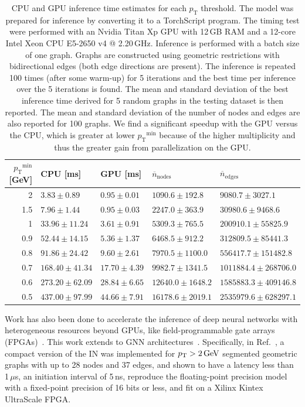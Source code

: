 \documentclass[twocolumn]{svjour3}
\newcommand{\pt}{\ensuremath{p_{\mathrm{T}}}\xspace}
\newcommand{\GeV}{\ensuremath{\,\text{Ge\hspace{-.08em}V}}\xspace}
\begin{document}
\begin{table}
\centering
\caption{CPU and GPU inference time estimates for each $\pt$ threshold. 
The model was prepared for inference by converting it to a TorchScript program.
The timing test were performed with an Nvidia Titan Xp GPU with 12\,GB RAM and a 12-core Intel Xeon CPU E5-2650 v4 @ 2.20\,GHz.
Inference is performed with a batch size of one graph. 
Graphs are constructed using geometric restrictions with bidirectional edges (both edge directions are present).
The inference is repeated 100 times (after some warm-up) for 5 iterations and the best time per inference over the 5 iterations is found.
The mean and standard deviation of the best inference time derived for 5 random graphs in the testing dataset is then reported.
The mean and standard deviation of the number of nodes and edges are also reported for 100 graphs.
We find a significant speedup with the GPU versus the CPU, which is greater at lower $\pt^\mathrm{min}$ because of the higher multiplicity and thus the greater gain from parallelization on the GPU.}
\label{tab:timing}      
\begin{tabular}{ r|llll }
$\pt^\mathrm{min}$ [GeV] & CPU [ms] & GPU [ms] & $\overline{n}_\mathrm{nodes}$ & $\overline{n}_\mathrm{edges}$ \\\hline
 2  &  $3.83 \pm 0.89$ &  $0.95 \pm 0.01$ & $1090.6 \pm 192.8$ & $9080.7 \pm 3027.1$ \\
 1.5  & $7.96 \pm 1.44$ & $0.95 \pm 0.03$ & $2247.0 \pm 363.9$ & $30980.6 \pm 9468.6$\\
  1  & $33.96 \pm 11.24$ & $3.61 \pm 0.91$ & $5309.3 \pm 765.5$ & $200910.1 \pm 55825.9$ \\
 0.9 & $52.44 \pm 14.15$ & $5.36 \pm 1.37$ & $6468.5 \pm 912.2$ & $312809.5 \pm 85441.3$ \\
 0.8 & $91.86 \pm 24.42$ & $9.60 \pm 2.61$ & $7970.5 \pm 1100.0$  &  $556417.7 \pm 151482.8$\\
 0.7 & $168.40 \pm 41.34$ & $17.70 \pm 4.39$ &  $9982.7 \pm 1341.5$ & $1011884.4 \pm 268706.0$\\
 0.6  & $273.20 \pm 62.09$ & $28.84 \pm 6.65$ & $12640.0 \pm 1648.2$ & $1585883.3 \pm 409146.8$ \\
 0.5  & $437.00 \pm 97.99$ &  $44.66 \pm 7.91$& $16178.6 \pm 2019.1$ &  $2535979.6 \pm 628297.1$\\
\end{tabular}
\end{table}

Work has also been done to accelerate the inference of deep neural networks with heterogeneous resources beyond GPUs, like field-programmable gate arrays (FPGAs)~\cite{FINN,FINNR,fpgadeep,fpgaover,Duarte:2018ite,Summers:2020xiy,bnnpaper,Coelho:2020zfu,Aarrestad:2021zos}.
This work extends to GNN architectures~\cite{Iiyama:2020wap,IN_fpga}.
Specifically, in Ref.~\cite{IN_fpga}, a compact version of the IN was implemented for $\pt > 2\GeV$ segmented geometric graphs with up to 28 nodes and 37 edges, and shown to have a latency less than 1\,$\mu$s, an initiation interval of 5\,ns, reproduce the floating-point precision model with a fixed-point precision of 16 bits or less, and fit on a Xilinx Kintex UltraScale FPGA. 
\end{document}
